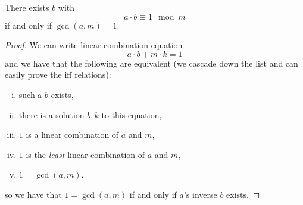 \begin{proposition}
    There exists $b$ with
    \[a\cdot b\equiv 1\mod{m}\]
    if and only if $\gcd(a, m) = 1$.
\end{proposition}
\begin{proof}
    We can write linear combination equation
    \[a\cdot b + m\cdot k = 1\]
    and we have that the following are equivalent (we cascade down the list and can easily prove the iff relations):
    \begin{enumerate}[i.]
        \item such a $b$ exists,
        \item there is a solution $b, k$ to this equation,
        \item $1$ is a linear combination of $a$ and $m$,
        \item $1$ is the \emph{least} linear combination of $a$ and $m$,
        \item $1 = \gcd(a, m)$.
    \end{enumerate}
    so we have that $1 = \gcd(a, m)$ if and only if $a$'s inverse $b$ exists.
\end{proof}